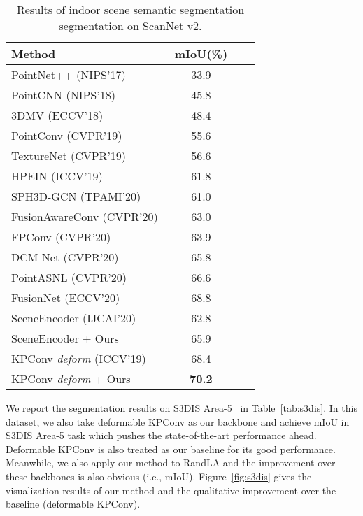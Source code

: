 \documentclass[final]{cvpr}
\begin{document}
\begin{table}
\centering
\begin{tabular}{lccc}  
\toprule
Method  & mIoU(\%) \\
\midrule
PointNet++ ({\color{blue}NIPS'17})~\cite{qi2017pointnet++} & 33.9 \\
PointCNN ({\color{blue}NIPS'18})~\cite{li2018pointcnn} & 45.8 \\
3DMV ({\color{blue}ECCV'18})~\cite{dai20183dmv} &48.4 \\ 
PointConv ({\color{blue}CVPR'19})~\cite{wu2019pointconv} & 55.6\\
TextureNet ({\color{blue}CVPR'19})~\cite{huang2019texturenet} & 56.6 \\
HPEIN ({\color{blue}ICCV'19})~\cite{jiang2019hierarchical} &61.8\\
SPH3D-GCN ({\color{blue}TPAMI'20})~\cite{lei2020spherical} & 61.0\\
FusionAwareConv ({\color{blue}CVPR'20})~\cite{zhang2020fusion} & 63.0 \\ 
FPConv ({\color{blue}CVPR'20})~\cite{lin2020fpconv} & 63.9\\
DCM-Net ({\color{blue}CVPR'20})~\cite{Schult_2020_CVPR} & 65.8 \\
PointASNL ({\color{blue}CVPR'20})~\cite{yan2020pointasnl} & 66.6 \\
FusionNet ({\color{blue}ECCV'20})~\cite{zhang2020deep} & 68.8\\
\midrule
SceneEncoder ({\color{blue}IJCAI'20})~\cite{xu2020sceneencoder} & 62.8\\
SceneEncoder + Ours & 65.9\\
\midrule
KPConv \textit{deform} ({\color{blue}ICCV'19})~\cite{thomas2019kpconv} & 68.4 \\
KPConv \textit{deform} + Ours & \textbf{70.2}\\
\bottomrule
\end{tabular}
\caption{Results of indoor scene semantic segmentation segmentation on ScanNet v2.}
\label{tab:scannet}
\end{table}



We report the segmentation results on S3DIS Area-5~\cite{armeni20163d} in Table~\ref{tab:s3dis}. In this dataset, we also take deformable KPConv as our backbone and achieve  mIoU in S3DIS Area-5 task which pushes the state-of-the-art performance ahead. Deformable KPConv is also treated as our baseline for its good performance. Meanwhile, we also apply our method to RandLA and the improvement over these backbones is also obvious (i.e.,  mIoU). Figure~\ref{fig:s3dis} gives the visualization results of our method and the qualitative improvement over the baseline (deformable KPConv).
\end{document}
